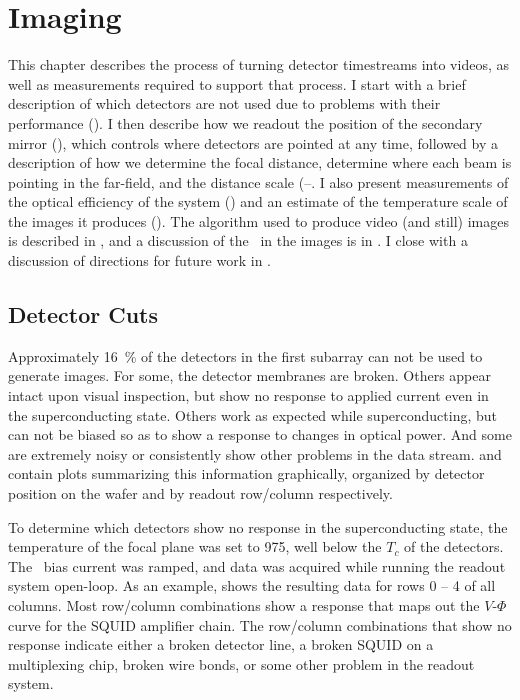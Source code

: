 \chapter{Imaging}\label{c:imaging}


This chapter describes the process of turning detector timestreams into videos, as well as measurements required to support that process.
I start with a brief description of which detectors are not used due to problems with their performance ().
I then describe how we readout the position of the secondary mirror (), which controls where detectors are pointed at any time, followed by a description of how we determine the focal distance, determine where each beam is pointing in the far-field, and the distance scale (--.
I also present measurements of the optical efficiency of the system () and an estimate of the temperature scale of the images it produces ().
The algorithm used to produce video (and still) images is described in , and a discussion of the \NETD\ in the images is in .
I close with a discussion of directions for future work in .

\section{Detector Cuts} \label{sec:ch8-det-cuts}

Approximately \SI{16}{\percent} of the detectors in the first subarray can not be used to generate images.
For some, the detector membranes are broken.
Others appear intact upon visual inspection, but show no response to applied current even in the superconducting state.
Others work as expected while superconducting, but can not be biased so as to show a response to changes in optical power. 
And some are extremely noisy or consistently show other problems in the data stream.
 and  contain plots summarizing this information graphically, organized by detector position on the wafer and by readout row/column respectively.

To determine which detectors show no response in the superconducting state, the temperature of the focal plane was set to \SI{975}{\mK}, well below the $T_c$ of the detectors.
The \TES\ bias current was ramped, and data was acquired while running the readout system open-loop.
As an example,  shows the resulting data for rows 0 -- 4 of all columns.
Most row/column combinations show a response that maps out the $V$-$\Phi$ curve for the SQUID amplifier chain.
The row/column combinations that show no response indicate either a broken detector line, a broken SQUID on a multiplexing chip, broken wire bonds, or some other problem in the readout system.

